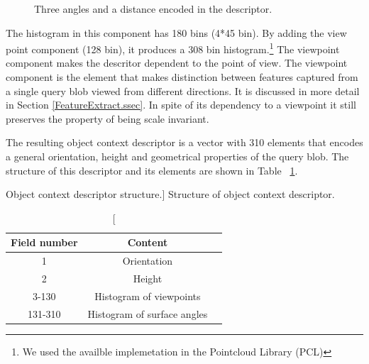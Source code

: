 \begin{figure}[t]
  \caption[Local geomentry elements of VFH.]
  {Three angles and a distance encoded in the descriptor.\cite{VFH_Definition}}
  \label{FPFH.figure}
\end{figure}

The histogram in this component has 180 bins (4*45 bin).
By adding the view point component (128 bin), it produces a 308 bin histogram.\footnote{We used the availble implemetation in the Pointcloud Library (PCL)}
The viewpoint component makes the descritor dependent to the point of view. The viewpoint component is the element that makes distinction between features captured from a single query blob viewed from different directions.
It is discussed in more detail in Section \ref{FeatureExtract.ssec}.
In spite of its dependency to a viewpoint it still preserves the property of being scale invariant. 




The resulting object context descriptor is a vector with 310 elements that encodes a general orientation, height and
geometrical properties of the query blob.
The structure of this descriptor and its elements are shown in Table ~\ref{Descriptor.table}.

\begin{table}
\centering
\caption
[Object context descriptor structure.]
{Structure of object context descriptor.}
\label{Descriptor.table}
\begin{tabular}{|c|c|c|}
\hline
Field number & Content\\

\hline

1 & Orientation\\

\hline

2 & Height\\

\hline

3-130 & Histogram of viewpoints \\

\hline

131-310 &  Histogram of surface angles\\

\hline

\end{tabular}
\end{table}

